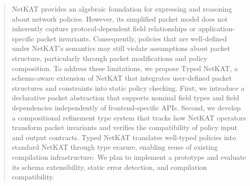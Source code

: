 \begin{abstract}
NetKAT provides an algebraic foundation for expressing and reasoning about network policies. However, its simplified packet model does not inherently capture protocol-dependent field relationships or application-specific packet invariants. Consequently, policies that are well-defined under NetKAT's semantics may still violate assumptions about packet structure, particularly through packet modifications and policy composition. To address these limitations, we propose Typed NetKAT, a schema-aware extension of NetKAT that integrates user-defined packet structures and constraints into static policy checking. First, we introduce a declarative packet abstraction that supports nominal field types and field dependencies independently of frontend-specific APIs. Second, we develop a compositional refinement type system that tracks how NetKAT operators transform packet invariants and verifies the compatibility of policy input and output contracts. Typed NetKAT translates well-typed policies into standard NetKAT through type erasure, enabling reuse of existing compilation infrastructure. We plan to implement a prototype and evaluate its schema extensibility, static error detection, and compilation compatibility.
\end{abstract}


